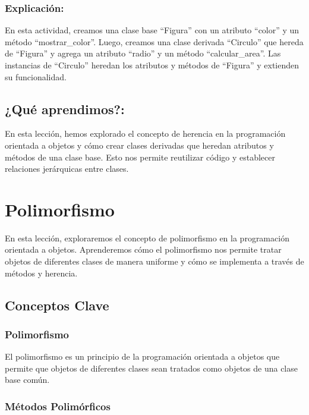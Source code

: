 \documentclass[
  a4paper,
  DIV=11,
  numbers=noendperiod,
  onepage,
  openany]{scrreprt}
\begin{document}
\subsection{Explicación:}\label{explicaciuxf3n-41}

En esta actividad, creamos una clase base ``Figura'' con un atributo
``color'' y un método ``mostrar\_color''. Luego, creamos una clase
derivada ``Circulo'' que hereda de ``Figura'' y agrega un atributo
``radio'' y un método ``calcular\_area''. Las instancias de ``Circulo''
heredan los atributos y métodos de ``Figura'' y extienden su
funcionalidad.

\section{¿Qué aprendimos?:}\label{quuxe9-aprendimos-17}

En esta lección, hemos explorado el concepto de herencia en la
programación orientada a objetos y cómo crear clases derivadas que
heredan atributos y métodos de una clase base. Esto nos permite
reutilizar código y establecer relaciones jerárquicas entre clases.

\chapter{Polimorfismo}\label{polimorfismo}

En esta lección, exploraremos el concepto de polimorfismo en la
programación orientada a objetos. Aprenderemos cómo el polimorfismo nos
permite tratar objetos de diferentes clases de manera uniforme y cómo se
implementa a través de métodos y herencia.

\section{Conceptos Clave}\label{conceptos-clave-25}

\subsection{Polimorfismo}\label{polimorfismo-1}

El polimorfismo es un principio de la programación orientada a objetos
que permite que objetos de diferentes clases sean tratados como objetos
de una clase base común.

\subsection{Métodos Polimórficos}\label{muxe9todos-polimuxf3rficos}
\end{document}
